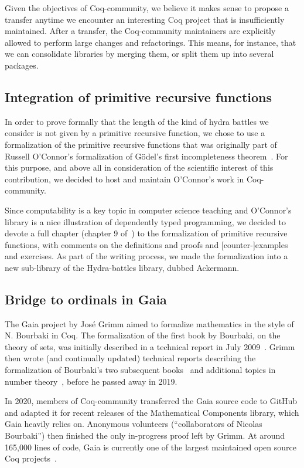 \documentclass{easychair}
\newcommand{\community}{Coq-community\xspace}
\begin{document}
Given the objectives of \community, we believe it makes sense to propose a transfer anytime we encounter an interesting Coq project that is insufficiently maintained.
%
After a transfer, the \community maintainers are explicitly allowed to perform large changes and refactorings.
%
This means, for instance, that we can consolidate libraries by merging them, or split them up into several packages.

\subsection{Integration of primitive recursive functions}

In order to prove formally that the length of the
kind of hydra battles we consider is not given by a primitive recursive function, we chose to use a formalization of the primitive recursive functions that was originally part of Russell O'Connor's formalization of G\"{o}del's first incompleteness theorem~\cite{OConnor05, Goedel}.
For this purpose, and above all in consideration of the scientific interest of this contribution, we decided to host and maintain O'Connor's work in \community.

Since computability is a key topic in computer science teaching and O'Connor's library is a nice illustration of dependently typed programming, we decided to devote a full chapter (chapter 9 of~\cite{HydraBook}) to the formalization of primitive recursive functions, with comments on the definitions and proofs and [counter-]examples and exercises. As part of the writing process, we made the formalization into a new sub-library of the Hydra-battles library, dubbed Ackermann.

\subsection{Bridge to ordinals in Gaia}

The Gaia project by Jos\'e Grimm aimed to formalize mathematics in the style of N. Bourbaki in Coq. The formalization of the first book by Bourbaki, on the theory of sets, was initially described in a technical report in July 2009~\cite{Grimm2009a}. Grimm then wrote (and continually updated) technical reports describing the formalization of Bourbaki's two subsequent books~\cite{Grimm2009b,Grimm2016} and additional topics in number theory~\cite{grimm:hal-00911710,Grimm2014}, before he passed away in 2019.

In 2020, members of \community transferred the Gaia source code to GitHub and adapted it for recent releases of the Mathematical Components library, which Gaia heavily relies on. Anonymous volunteers (``collaborators of Nicolas Bourbaki'') then finished the only in-progress proof left by Grimm. At around 165,000 lines of code, Gaia is currently one of the largest maintained open source Coq projects~\cite{Gaia}.
\end{document}

